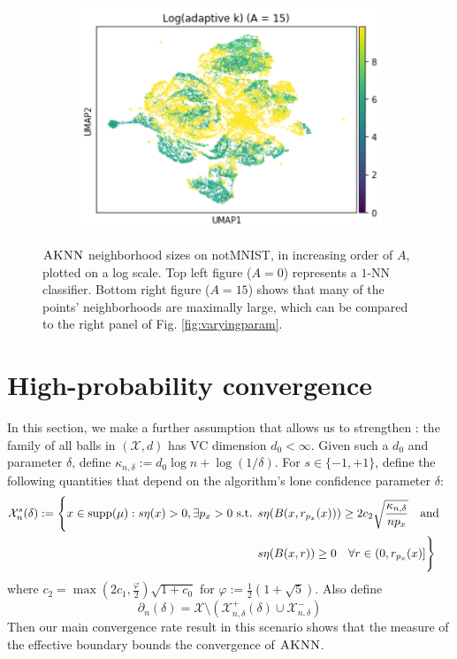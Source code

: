 \documentclass{article}
\def\X{{\mathcal X}}
\def\supp{{\rm supp}}
\newcommand{\algname}{\textsc{AKNN}}
\begin{document}
\begin{figure}
\begin{subfigure}[t]{0.32\textwidth}
        \includegraphics[width=\linewidth]{figs/notMNIST_logadaK_Aeq15.png} %
    \end{subfigure}
    \hfill
  \caption{$\algname$ neighborhood sizes on notMNIST, in increasing order of $A$, plotted on a log scale. Top left figure ($A = 0$) represents a $1$-NN classifier. Bottom right figure ($A = 15$) shows that many of the points' neighborhoods are maximally large, which can be compared to the right panel of Fig. \ref{fig:varyingparam}.}
  \label{fig:varyingadak}
\end{figure}







\appendix

\section{High-probability convergence}

In this section, we make a further assumption that allows us to strengthen : 
the family of all balls in $(\X, d)$ has VC dimension $d_0 < \infty$. 
Given such a $d_0$ and parameter $\delta$, define $\kappa_{n, \delta} := d_0 \log n + \log (1/\delta)$. 
For $s \in \{ -1, +1 \}$, define the following quantities that depend on the algorithm's lone confidence parameter $\delta$:
\begin{align*}
\X^{s}_n (\delta)
:= \Bigg\{
x \in \supp(\mu) : s \eta(x) > 0 , \exists p_x > 0 \text{ s.t. } 
&s \eta(B(x,r_{p_x}(x))) \geq 2 c_2 \sqrt{\frac{ \kappa_{n, \delta} }{n p_x}}
\quad\text{and}\quad \\
&s \eta(B(x,r)) \geq 0 \quad\forall r \in (0, r_{p_x}(x)]
\Bigg\}
\end{align*}
where $c_2 = \max(2c_1, \frac{\varphi}{2} ) \sqrt{1 + c_0}$ for $\varphi := \frac{1}{2} (1 + \sqrt{5})$.
Also define 
$$ \partial_n (\delta) = \X \setminus (\X^+_{n,\delta} (\delta) \cup \X^-_{n,\delta}) $$
Then our main convergence rate result in this scenario shows that the measure of the effective boundary bounds the convergence of $\algname$.
\end{document}
